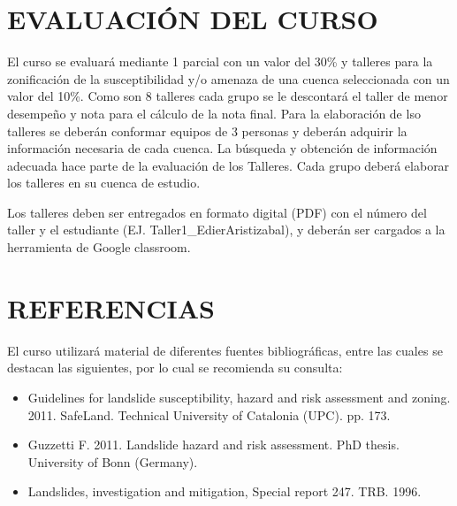 \documentclass[twoside,11pt,]{article}
\begin{document}
\section{EVALUACIÓN DEL CURSO}
El curso se evaluará mediante 1 parcial con un valor del 30\% y talleres para la zonificación de la susceptibilidad y/o amenaza de una cuenca seleccionada con un 
valor del 10\%. Como son 8 talleres cada grupo se le descontará el taller de menor desempeño y nota para el cálculo de la nota final. Para la elaboración de lso talleres se deberán conformar equipos de 3 personas y deberán adquirir la información necesaria de cada cuenca. La búsqueda y obtención de 
información adecuada hace parte de la evaluación de los Talleres. Cada grupo deberá elaborar los talleres en su cuenca de estudio.
\par Los talleres deben ser entregados en formato digital (PDF) con el número del taller y el estudiante (EJ. Taller1\_EdierAristizabal), 
y deberán ser cargados a la herramienta de Google classroom.

\section{REFERENCIAS}
El curso utilizará material de diferentes fuentes bibliográficas, entre las cuales se destacan las siguientes, por lo cual se recomienda su consulta:
\begin{itemize}
\item Guidelines for landslide susceptibility, hazard and risk assessment and zoning. 2011. SafeLand. Technical University of Catalonia (UPC). pp. 173.
\item Guzzetti F. 2011. Landslide hazard and risk assessment. PhD  thesis. University of Bonn (Germany). 
\item Landslides, investigation and mitigation, Special report 247. TRB. 1996.
\end{itemize}
\end{document}
